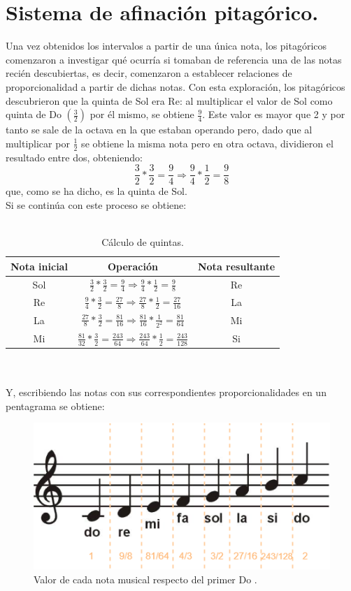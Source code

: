 \documentclass[a4paper, openright, 11pt, titlepage]{report}
\theoremstyle{definition}\newtheorem{defin}[propo]{Definition}
\theoremstyle{definition}\newtheorem{obser}[propo]{Remark}
\theoremstyle{definition}\newtheorem{ejem}[propo]{Ejemplo}
\theoremstyle{definition}\newtheorem{algoritmo}[propo]{Algoritmo}
\begin{document}
\section{Sistema de afinación pitagórico.}
Una vez obtenidos los intervalos a partir de una única nota, los pitagóricos comenzaron a investigar qué ocurría si tomaban de referencia una de las notas recién descubiertas, es decir, comenzaron a establecer relaciones de proporcionalidad a partir de dichas notas. Con esta exploración, los pitagóricos descubrieron que la quinta de Sol era Re: al multiplicar el valor de Sol como quinta de Do $(\frac{3}{2})$ por él mismo, se obtiene $\frac{9}{4}$. Este valor es mayor que 2 y por tanto se sale de la octava en la que estaban operando pero, dado que al multiplicar por $\frac{1}{2}$ se obtiene la misma nota pero en otra octava, dividieron el resultado entre dos, obteniendo: $$\frac{3}{2}*\frac{3}{2} = \frac{9}{4} \Longrightarrow \frac{9}{4}*\frac{1}{2} = \frac{9}{8}$$
que, como se ha dicho, es la quinta de Sol. \\
Si se continúa con este proceso se obtiene:\\\\
\begin{table}
\centering
\begin{tabular}{c|c|c}
\hline
     Nota inicial & Operación & Nota resultante \\
     \hline \hline
     Sol & $\frac{3}{2}*\frac{3}{2} = \frac{9}{4} \Longrightarrow \frac{9}{4}*\frac{1}{2} = \frac{9}{8}$ & Re \\
     Re & $\frac{9}{4}*\frac{3}{2} = \frac{27}{8} \Longrightarrow \frac{27}{8}*\frac{1}{2} = \frac{27}{16}$ & La \\
     La & $\frac{27}{8}*\frac{3}{2} = \frac{81}{16} \Longrightarrow \frac{81}{16}*\frac{1}{2^{2}} = \frac{81}{64}$ & Mi\\
     Mi & $\frac{81}{32}*\frac{3}{2} = \frac{243}{64} \Longrightarrow \frac{243}{64}*\frac{1}{2} = \frac{243}{128}$ & Si \\
     \hline
\end{tabular}
\caption{Cálculo de quintas.}
\end{table}
\\\\
Y, escribiendo las notas con sus correspondientes proporcionalidades en un pentagrama se obtiene:
\begin{figure}[H]
    \centering
    \includegraphics[scale = 0.6]{pentagrama.png}
    \caption{Valor de cada nota musical respecto del primer Do .}
\end{figure}
\end{document}
